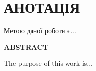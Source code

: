 \chapter*{АНОТАЦІЯ}

Метою даної роботи є...

\vspace{2cm}

\begin{center}
\textbf{ABSTRACT}
\end{center}

The purpose of this work is...
\newpage
